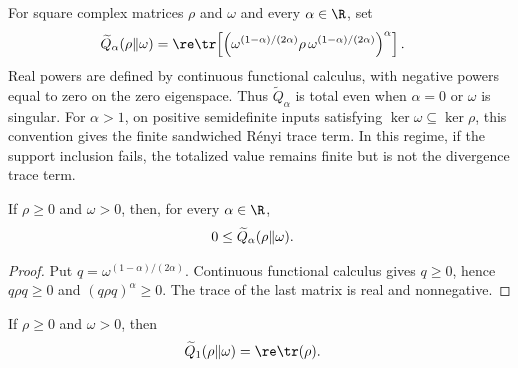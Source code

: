 \begin{definition}
    \label{def:sandwiched_renyi_trace}
    \leanok
    For square complex matrices $\rho$ and $\omega$ and every $\alpha\in\R$,
    set
    \begin{align}
        \widetilde Q_\alpha(\rho\Vert\omega)
         & =\re\tr\!\left[
            \left(\omega^{(1-\alpha)/(2\alpha)}
            \rho\,\omega^{(1-\alpha)/(2\alpha)}\right)^\alpha
            \right].
        \label{eq:sandwiched_renyi_trace}
    \end{align}
    Real powers are defined by continuous functional calculus, with negative
    powers equal to zero on the zero eigenspace.  Thus
    $\widetilde Q_\alpha$ is total even when $\alpha=0$ or $\omega$ is singular.
    For $\alpha>1$, on positive semidefinite inputs satisfying
    $\ker\omega\subseteq\ker\rho$, this convention gives the finite
    sandwiched R\'enyi trace term.  In this regime, if the support inclusion
    fails, the totalized value remains finite but is not the divergence trace
    term.
\end{definition}

\begin{theorem}
    \label{thm:sandwiched_renyi_trace_nonneg}
    \leanok
    If $\rho\geq0$ and $\omega>0$, then, for every $\alpha\in\R$,
    \begin{align}
        0 & \leq\widetilde Q_\alpha(\rho\Vert\omega).
        \notag
    \end{align}
\end{theorem}

\begin{proof}\leanok
    Put $q=\omega^{(1-\alpha)/(2\alpha)}$.  Continuous functional calculus
    gives $q\geq0$, hence $q\rho q\geq0$ and $(q\rho q)^\alpha\geq0$.
    The trace of the last matrix is real and nonnegative.
\end{proof}

\begin{theorem}
    \label{thm:sandwiched_renyi_trace_one}
    \leanok
    If $\rho\geq0$ and $\omega>0$, then
    \begin{align}
        \widetilde Q_1(\rho\Vert\omega) & =\re\tr(\rho).
        \notag
    \end{align}
\end{theorem}

